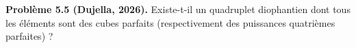 \textbf{Problème 5.5 (Dujella, 2026).} Existe-t-il un quadruplet diophantien dont tous les éléments sont des cubes parfaits (respectivement des puissances quatrièmes parfaites) ?
